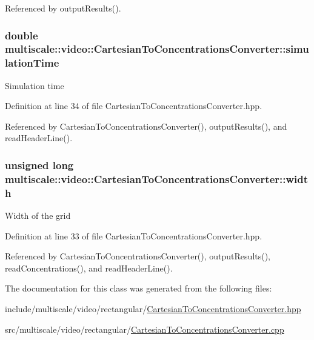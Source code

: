 Referenced by output\-Results().

\hypertarget{classmultiscale_1_1video_1_1CartesianToConcentrationsConverter_a6e66af60b82513b3186fdb32cad44597}{
\subsubsection[{simulation\-Time}]{\setlength{\rightskip}{0pt plus 5cm}double multiscale\-::video\-::\-Cartesian\-To\-Concentrations\-Converter\-::simulation\-Time\hspace{0.3cm}{\ttfamily [private]}}}\label{classmultiscale_1_1video_1_1CartesianToConcentrationsConverter_a6e66af60b82513b3186fdb32cad44597}
Simulation time 

Definition at line 34 of file Cartesian\-To\-Concentrations\-Converter.\-hpp.



Referenced by Cartesian\-To\-Concentrations\-Converter(), output\-Results(), and read\-Header\-Line().

\hypertarget{classmultiscale_1_1video_1_1CartesianToConcentrationsConverter_ae6fba5af405d884c7b70ed206a6d5cb1}{
\subsubsection[{width}]{\setlength{\rightskip}{0pt plus 5cm}unsigned long multiscale\-::video\-::\-Cartesian\-To\-Concentrations\-Converter\-::width\hspace{0.3cm}{\ttfamily [private]}}}\label{classmultiscale_1_1video_1_1CartesianToConcentrationsConverter_ae6fba5af405d884c7b70ed206a6d5cb1}
Width of the grid 

Definition at line 33 of file Cartesian\-To\-Concentrations\-Converter.\-hpp.



Referenced by Cartesian\-To\-Concentrations\-Converter(), output\-Results(), read\-Concentrations(), and read\-Header\-Line().



The documentation for this class was generated from the following files\-:\begin{DoxyCompactItemize}
\item 
include/multiscale/video/rectangular/\hyperlink{CartesianToConcentrationsConverter_8hpp}{Cartesian\-To\-Concentrations\-Converter.\-hpp}\item 
src/multiscale/video/rectangular/\hyperlink{CartesianToConcentrationsConverter_8cpp}{Cartesian\-To\-Concentrations\-Converter.\-cpp}\end{DoxyCompactItemize}
